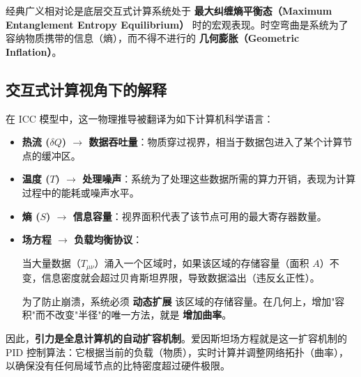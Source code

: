 \begin{theorem}[全息平衡定理]
经典广义相对论是底层交互式计算系统处于 \textbf{最大纠缠熵平衡态（Maximum Entanglement Entropy Equilibrium）} 时的宏观表现。时空弯曲是系统为了容纳物质携带的信息（熵），而不得不进行的 \textbf{几何膨胀（Geometric Inflation）}。
\end{theorem}

\subsection{交互式计算视角下的解释}

在 ICC 模型中，这一物理推导被翻译为如下计算机科学语言：

\begin{itemize}
\item \textbf{热流 ($\delta Q$) $\rightarrow$ 数据吞吐量}：物质穿过视界，相当于数据包进入了某个计算节点的缓冲区。

\item \textbf{温度 ($T$) $\rightarrow$ 处理噪声}：系统为了处理这些数据所需的算力开销，表现为计算过程中的能耗或噪声水平。

\item \textbf{熵 ($S$) $\rightarrow$ 信息容量}：视界面积代表了该节点可用的最大寄存器数量。

\item \textbf{场方程 $\rightarrow$ 负载均衡协议}：

    当大量数据（$T_{\mu\nu}$）涌入一个区域时，如果该区域的存储容量（面积 $A$）不变，信息密度就会超过贝肯斯坦界限，导致数据溢出（违反幺正性）。

    为了防止崩溃，系统必须 \textbf{动态扩展} 该区域的存储容量。在几何上，增加"容积"而不改变"半径"的唯一方法，就是 \textbf{增加曲率}。
\end{itemize}

因此，\textbf{引力是全息计算机的自动扩容机制}。爱因斯坦场方程就是这一扩容机制的 PID 控制算法：它根据当前的负载（物质），实时计算并调整网络拓扑（曲率），以确保没有任何局域节点的比特密度超过硬件极限。

